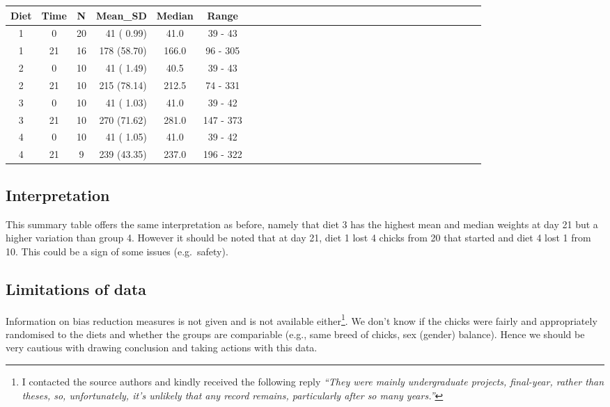 \documentclass[letterpaperpaper,9pt,twocolumn,twoside,printwatermark=false]{pinp}
\begin{document}
\begin{table}[H]
\centering
\begin{tabular}{cccrccccrccccrccccrccccrccccrc}
\toprule
\textbf{Diet} & \textbf{Time} & \textbf{N} & \textbf{Mean\_SD} & \textbf{Median} & \textbf{Range}\\
\midrule
1 & 0 & 20 & 41 ( 0.99) & 41.0 & 39 - 43\\
1 & 21 & 16 & 178 (58.70) & 166.0 & 96 - 305\\
2 & 0 & 10 & 41 ( 1.49) & 40.5 & 39 - 43\\
2 & 21 & 10 & 215 (78.14) & 212.5 & 74 - 331\\
3 & 0 & 10 & 41 ( 1.03) & 41.0 & 39 - 42\\
3 & 21 & 10 & 270 (71.62) & 281.0 & 147 - 373\\
4 & 0 & 10 & 41 ( 1.05) & 41.0 & 39 - 42\\
4 & 21 & 9 & 239 (43.35) & 237.0 & 196 - 322\\
\bottomrule
\end{tabular}
\end{table}

\hypertarget{interpretation-5}{%
\subsection{Interpretation}\label{interpretation-5}}

This summary table offers the same interpretation as before, namely that
diet 3 has the highest mean and median weights at day 21 but a higher
variation than group 4. However it should be noted that at day 21, diet
1 lost 4 chicks from 20 that started and diet 4 lost 1 from 10. This
could be a sign of some issues (e.g.~safety).

\hypertarget{limitations-of-data}{%
\subsection{Limitations of data}\label{limitations-of-data}}

Information on bias reduction measures is not given and is not available
either\footnote{I contacted the source authors and kindly received the
  following reply \emph{``They were mainly undergraduate projects,
  final-year, rather than theses, so, unfortunately, it's unlikely that
  any record remains, particularly after so many years.''}}. We don't
know if the chicks were fairly and appropriately randomised to the diets
and whether the groups are compariable (e.g., same breed of chicks, sex
(gender) balance). Hence we should be very cautious with drawing
conclusion and taking actions with this data.
\end{document}
